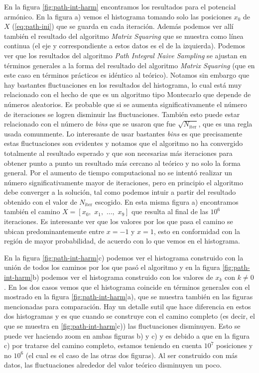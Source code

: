 \documentclass[%
 reprint,
 amsmath,amssymb,
 aps,
 pra,
]{revtex4-2}
\begin{document}
En la figura \ref{fig:path-int-harm} encontramos los resultados para el potencial armónico. En la figura a) vemos el histograma tomando solo las posiciones $x_0$ de  $X$ (\ref{eq:path-ini}) que se guarda en cada iteración. Además podemos ver allí también el resultado del algoritmo \textit{Matrix Squaring} que se muestra como línea continua (el eje y correspondiente a estos datos es el de la izquierda). Podemos ver que los resultados del algoritmo \textit{Path Integral Naive Sampling} se ajustan en términos generales a la forma del resultado del algoritmo \textit{Matrix Squaring} (que en este caso en términos prácticos es idéntico al teórico). Notamos sin embargo que hay bastantes fluctuaciones en los resultados del histograma, lo cual está muy relacionado con el hecho de que es un algoritmo tipo Montecarlo que depende de números aleatorios. Es probable que si se aumenta significativamente el número de iteraciones se logren disminuir las fluctuaciones. También esto puede estar relacionado con el número de \textit{bins} que se usaron que fue $\sqrt{N_\mathrm{iter}}$, que es una regla usada comunmente. Lo interesante de usar bastantes \textit{bins} es que precisamente estas fluctuaciones son evidentes y notamos que el algoritmo no ha convergido totalmente al resultado esperado y que son necesarias más iteraciones para obtener punto a punto un resultado más cercano al teórico y no solo la forma general. Por el aumento de tiempo computacional no se intentó realizar un número significativamente mayor de iteraciones, pero en principio el algoritmo debe converger a la solución, tal como podemos intuir a partir del resultado obtenido con el valor de $N_\mathrm{iter}$ escogido. En esta misma figura a) encontramos también el camino $X=[x_0,\,\,x_1,\,\,\dots,\,\,x_{9}]$ que resulta al final de las $10^6$ iteraciones. Es interesante ver que los valores por los que pasa el camino se ubican predominantemente entre $x=-1$ y $x=1$, esto en conformidad con la región de mayor probabilidad, de acuerdo con lo que vemos en el histograma.

En la figura \ref{fig:path-int-harm}c) podemos ver el histograma construido con la unión de todos los caminos por los que pasó el algoritmo y en  la figura \ref{fig:path-int-harm}b) podemos ver el histograma construido con los valores de $x_k$ con $k \neq 0$. En los dos casos vemos que el histograma coincide en términos generales con el mostrado en la figura \ref{fig:path-int-harm}a), que se muestra también en las figuras mencionadas para comparación. Hay un detalle sutil que hace diferencia en estos dos histogramas y es que cuando se construye con el camino completo (es decir, el que se muestra en \ref{fig:path-int-harm}c)) las fluctuaciones disminuyen. Esto se puede ver haciendo zoom en ambas figuras b) y c) y es debido a que en la figura c) por tratarse del camino completo, estamos teniendo en cuenta $10^7$ posiciones y no $10^6$ (el cual es el caso de las otras dos figuras). Al ser construido con más datos, las fluctuaciones alrededor del valor teórico disminuyen un poco.
\end{document}
